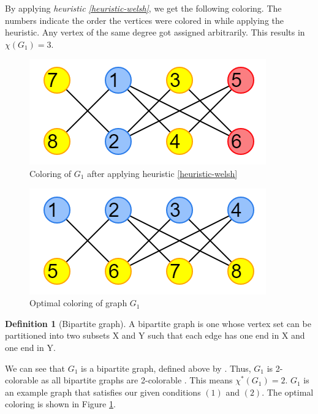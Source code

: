\documentclass{article}
\newcounter{heuristic} \setcounter{heuristic}{0}
\theoremstyle{definition}
\newtheorem{definition}{Definition}
\begin{document}
By applying \emph{heuristic \ref{heuristic-welsh}}, we get the following coloring. The numbers indicate the order the vertices were colored in while applying the heuristic. Any vertex of the same degree got assigned arbitrarily. This results in \(\chi(G_1) = 3\).

\begin{multicols}{2}
  \begin{figure}[H]
  \centering
  \includegraphics[scale=0.5]{images/graph-2.png}
  \caption{Coloring of $G_1$ after applying heuristic \ref{heuristic-welsh}}
  \end{figure}

  \begin{figure}[H]
  \centering
  \includegraphics[scale=0.5]{images/graph-3.png}
  \caption{Optimal coloring of graph \(G_1\)}\label{fig:ex1-optimal}
  \end{figure}
\end{multicols}



\begin{definition}[Bipartite graph]
A bipartite graph is one whose vertex set can be partitioned into two subsets X and Y such that each edge has one end in X and one end in Y.
\end{definition}

We can see that $G_1$ is a bipartite graph, defined above by \cite{bondymurty}. Thus, \(G_1\) is 2-colorable as all bipartite graphs are 2-colorable \cite{asratian1998bipartite}. This means \(\chi^{*}(G_1) = 2\). \(G_1\) is an example graph that satisfies our given conditions \((1)\) and \((2)\). The optimal coloring is shown in Figure \ref{fig:ex1-optimal}.
\end{document}

